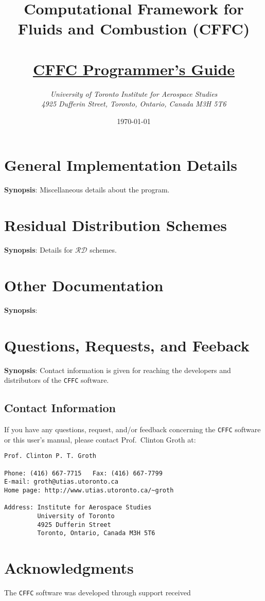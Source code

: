 \documentclass[11pt]{report}
\title{\Large \bf
       Computational Framework for Fluids and Combustion (CFFC)\\
       \ \\ \Huge
       \protect\underline{CFFC Programmer's Guide}}
\author{\Large \em 
        University of Toronto Institute for Aerospace Studies\\
        \Large \em
        4925 Dufferin Street, Toronto, Ontario, Canada M3H 5T6}
\date{\today}
\begin{document}
\maketitle

\tableofcontents

\chapter{General Implementation Details}

\textbf{Synopsis}: Miscellaneous details about the program.

\chapter{Residual Distribution Schemes}

\textbf{Synopsis}: Details for $\mathcal{RD}$ schemes.

\chapter{Other Documentation}

{\bf Synopsis}: 

\chapter{Questions, Requests, and Feeback}

{\bf Synopsis}: Contact information is given for reaching the
                developers and distributors of the 
                {\tt CFFC} software.

\section{Contact Information}

If you have any questions, request, and/or feedback concerning the 
{\tt CFFC} software or this user's manual,
please contact Prof.\ Clinton Groth at:
\begin{verbatim}
Prof. Clinton P. T. Groth

Phone: (416) 667-7715   Fax: (416) 667-7799
E-mail: groth@utias.utoronto.ca
Home page: http://www.utias.utoronto.ca/~groth

Address: Institute for Aerospace Studies
         University of Toronto
         4925 Dufferin Street
         Toronto, Ontario, Canada M3H 5T6
\end{verbatim}

\chapter{Acknowledgments}

The {\tt CFFC} software was developed through 
support received
\end{document}
